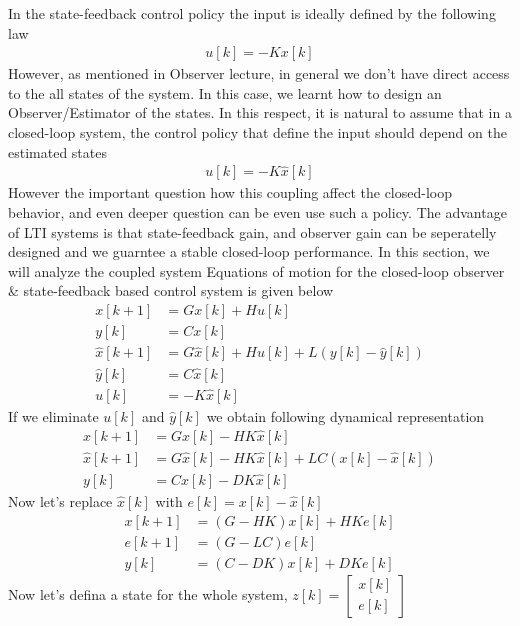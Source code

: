 \documentclass[twoside]{article}
\begin{document}
In the state-feedback control policy the input is ideally defined
by the following law
%
\begin{align*}
 u[k] = - K x[k]
\end{align*}
%
However, as mentioned in Observer lecture, in general we don't have
direct access to the all states of the system. In this case, we learnt
how to design an Observer/Estimator of the states. In this respect,
it is natural to assume that in a closed-loop system, the control
policy that define the input should depend on the estimated states
%
\begin{align*}
 u[k] = - K \hat{x}[k]
\end{align*}
%
However the important question how this coupling affect the
closed-loop behavior, and even deeper question can be even 
use such a policy. The advantage of LTI systems is that 
state-feedback gain, and observer gain can be seperatelly
designed and we guarntee a stable closed-loop performance. 
In this section, we will analyze the coupled system
%
Equations of motion for the closed-loop observer \& state-feedback
based control system is given below
%
\begin{align*}
   x[k+1] &= G x[k] + H u[k]
  \\ 
   y[k] &= C x[k] 
  \\
  \hat{x}[k+1] &= G \hat{x}[k] + H u[k] + L \left( y[k] - \hat{y}[k] \right) 
  \\
  \hat{y}[k] &= C \hat{x}[k] 
  \\
   u[k] &= -K \hat{x}[k]
\end{align*}
%
If we eliminate $u[k]$ and $\hat{y}[k]$ we obtain following 
dynamical representation
%
\begin{align*}
   x[k+1] &= G x[k] - H K \hat{x}[k] 
  \\
  \hat{x}[k+1] &= G \hat{x}[k] - H K \hat{x}[k] + L C \left( x[k] -
                 \hat{x}[k] \right) 
  \\ 
   y[k] &= C x[k] - D K \hat{x}[k] 
\end{align*}
%
Now let's replace $\hat{x}[k]$ with $e[k] = x[k] - \hat{x}[k]$
%
\begin{align*}
   x[k+1] &= ( G - H K ) x[k] + H K e[k]
  \\
  e[k+1] &= ( G - LC ) e[k]
  \\ 
   y[k] &= (C - D K) x[k] + D K e[k]
\end{align*}
%
Now let's defina a state for the whole system, 
$z[k] = \left[ \begin{array}{c} x[k] \\ e[k] \end{array} \right]$
\end{document}
